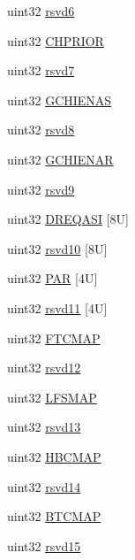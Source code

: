\begin{DoxyCompactItemize}
\item 
uint32 \mbox{\hyperlink{structdmaBase_a045387b1c26927424477521f46cd7890}{rsvd6}}
\item 
uint32 \mbox{\hyperlink{structdmaBase_abf0b888860e74923cbc2ea531c9601d9}{C\+H\+P\+R\+I\+OR}}
\item 
uint32 \mbox{\hyperlink{structdmaBase_ab63a59f22a984938dcfd5204eab368de}{rsvd7}}
\item 
uint32 \mbox{\hyperlink{structdmaBase_a6f705c0af0825d0d8ca1f8504fcd75fb}{G\+C\+H\+I\+E\+N\+AS}}
\item 
uint32 \mbox{\hyperlink{structdmaBase_a6c1686dbc9c9a922ccb0303b8a0e087e}{rsvd8}}
\item 
uint32 \mbox{\hyperlink{structdmaBase_a14f6297e6b610c85af74b7466e628e6b}{G\+C\+H\+I\+E\+N\+AR}}
\item 
uint32 \mbox{\hyperlink{structdmaBase_a021fe4d9fb4a60d4a501fd3fbb174187}{rsvd9}}
\item 
uint32 \mbox{\hyperlink{structdmaBase_aff761f82738fe183e60ab17ef6669e47}{D\+R\+E\+Q\+A\+SI}} \mbox{[}8\+U\mbox{]}
\item 
uint32 \mbox{\hyperlink{structdmaBase_a00218a961fb28dfaf2afc80ff3e72164}{rsvd10}} \mbox{[}8\+U\mbox{]}
\item 
uint32 \mbox{\hyperlink{structdmaBase_a735e065c8d40ca7363a065129965b17c}{P\+AR}} \mbox{[}4\+U\mbox{]}
\item 
uint32 \mbox{\hyperlink{structdmaBase_a4d72a1435ccf3f3a02002579d1ba268b}{rsvd11}} \mbox{[}4\+U\mbox{]}
\item 
uint32 \mbox{\hyperlink{structdmaBase_abf994c235d889db09d845f5b3571e965}{F\+T\+C\+M\+AP}}
\item 
uint32 \mbox{\hyperlink{structdmaBase_aa6766a1ba808ed30a6576a77367c1414}{rsvd12}}
\item 
uint32 \mbox{\hyperlink{structdmaBase_a55cfc088d6dcb609f000cd33097e7f5c}{L\+F\+S\+M\+AP}}
\item 
uint32 \mbox{\hyperlink{structdmaBase_a4ae037a706d344710855fe82abe4d5d8}{rsvd13}}
\item 
uint32 \mbox{\hyperlink{structdmaBase_ae56d36731c1b6f8c74738f8e767787da}{H\+B\+C\+M\+AP}}
\item 
uint32 \mbox{\hyperlink{structdmaBase_a26c85a32d852d496746506b0168a913f}{rsvd14}}
\item 
uint32 \mbox{\hyperlink{structdmaBase_a0bb6e9af988801ea066f0ea5c5972d1f}{B\+T\+C\+M\+AP}}
\item 
uint32 \mbox{\hyperlink{structdmaBase_abdf230e93acb201a3d8c10550e833fba}{rsvd15}}

\end{DoxyCompactItemize}
